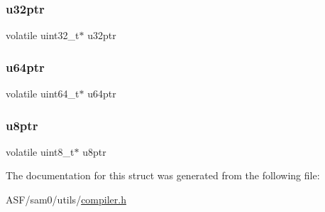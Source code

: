 \subsubsection{\texorpdfstring{u32ptr}{u32ptr}}
{\footnotesize\ttfamily volatile uint32\+\_\+t$\ast$ u32ptr}

\mbox{\label{struct_struct_v_ptr_a1acc0e7be6320444fc9a35fbd89f1f37}} 
\subsubsection{\texorpdfstring{u64ptr}{u64ptr}}
{\footnotesize\ttfamily volatile uint64\+\_\+t$\ast$ u64ptr}

\mbox{\label{struct_struct_v_ptr_a4213589251839cd1f42c3343c6cb9be9}} 
\subsubsection{\texorpdfstring{u8ptr}{u8ptr}}
{\footnotesize\ttfamily volatile uint8\+\_\+t$\ast$ u8ptr}



The documentation for this struct was generated from the following file\+:\begin{DoxyCompactItemize}
\item 
A\+S\+F/sam0/utils/\mbox{\hyperlink{compiler_8h}{compiler.\+h}}\end{DoxyCompactItemize}
